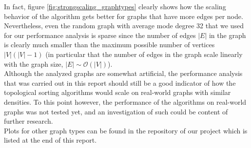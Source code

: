 In fact, figure \ref{fig:strongscaling_graphtypes} clearly shows how the scaling behavior of the algorithm gets better for graphs that have more edges per node.
Nevertheless, even the random graph with average mode degree 32 that we used for our performance analysis is sparse since the number of edges $|E|$ in the graph is clearly much smaller than the maximum possible number of vertices $|V|(|V|-1)$ (in particular that the number of edges in the graph scale linearly with the graph size, $|E| \sim \mathcal{O} ( |V| )$). \\
Although the analyzed graphs are somewhat artificial, the performance analysis that was carried out in this report should still be a good indicator of how the topological sorting algorithms would scale on real-world graphs with similar densities.
To this point however, the performance of the algorithms on real-world graphs was not tested yet, and an investigation of such could be content of further research. \\
%
Plots for other graph types can be found in the repository of our project which is listed at the end of this report.
